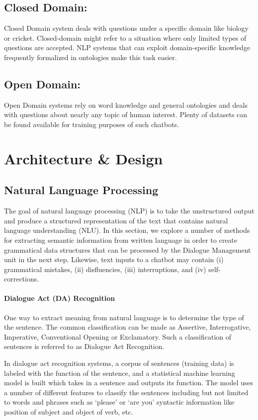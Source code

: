 \subsection*{Closed Domain:}
Closed Domain system deals with questions under a specific domain like biology
or cricket. Closed-domain might refer to a situation where only limited types of
questions are accepted. NLP systems that can exploit domain-specific knowledge
frequently formalized in ontologies make this task easier. 

\subsection*{Open Domain:}
Open Domain systems rely on word knowledge and general ontologies and deals with
questions about nearly any topic of human interest. Plenty of datasets can be
found available for training purposes of such chatbots.

\section{Architecture \& Design}
\subsection{Natural Language Processing}
The goal of natural language processing (NLP) is to take the unstructured output
and produce a structured representation of the text that contains natural
language understanding (NLU). In this section, we explore a number of methods
for extracting semantic information from written language in order to create
grammatical data structures that can be processed by the Dialogue Management
unit in the next step.  Likewise, text inputs to a chatbot may contain (i)
grammatical mistakes, (ii) disfluencies, (iii) interruptions, and (iv)
self-corrections.

\paragraph{Dialogue Act (DA) Recognition}

One way to extract meaning from natural language is to determine the type of the
sentence. The common classification can be made as Assertive, Interrogative,
Imperative, Conventional Opening or Exclamatory. Such a classification of
sentences is referred to as Dialogue Act Recognition. 

In dialogue act recognition systems, a corpus of sentences (training data) is
labeled with the function of the sentence, and a statistical machine learning
model is built which takes in a sentence and outputs its function. The model
uses a number of different features to classify the sentences including but not
limited to words and phrases such as ‘please’ or ‘are you’ syntactic information
like position of subject and object of verb, etc.

